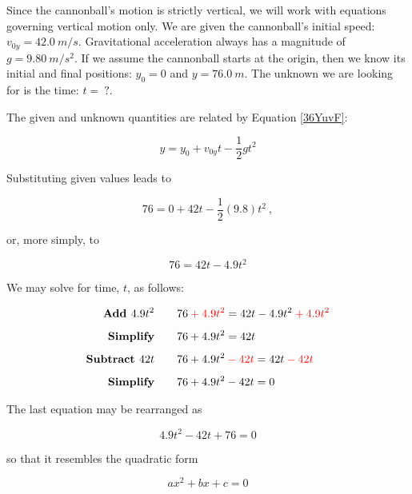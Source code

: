 \documentclass[main.tex]{subfiles}
\begin{document}
\Solution Since the cannonball's motion is strictly vertical, we will work with equations governing vertical motion only. We are given the cannonball's initial speed: $v_{0y} = \SI{42.0}{m/s}$. Gravitational acceleration always has a magnitude of $g = \SI{9.80}{m/s^2}$. If we assume the cannonball starts at the origin, then we know its initial and final positions: $y_0 = 0$ and $y = \SI{76.0}{m}$. The unknown we are looking for is the time: $t =\ ?$.

\vspace{1em}

The given and unknown quantities are related by Equation \eqref{36YuvF}:

\begin{equation*}
    y = y_0 + v_{0y}t - \frac{1}{2}  g t^2
\end{equation*}

Substituting given values leads to 

\begin{equation*}
    76 =  0 + 42 t -\frac{1}{2}(9.8) t^2\ ,
\end{equation*}

or, more simply, to

\begin{equation*}
    76 = 42 t - 4.9 t^2
\end{equation*}

We may solve for time, $t$, as follows:

\begin{align*}
    \textbf{Add $4.9 t^2$} \qquad & 76 \mathbin{\color{red} +} \textcolor{red}{4.9 t^2} = 42 t - 4.9 t^2 \mathbin{\color{red} +} \textcolor{red}{4.9 t^2}\\[1ex]
    \textbf{Simplify} \qquad & 76 + 4.9 t^2 = 42 t\\[1ex]
    \textbf{Subtract $42 t$} \qquad & 76 + 4.9 t^2 \mathbin{\color{red} -} \textcolor{red}{42 t} = 42 t \mathbin{\color{red} -} \textcolor{red}{42 t}\\[1ex]
    \textbf{Simplify} \qquad & 76 + 4.9 t^2 - 42 t = 0
\end{align*}

The last equation may be rearranged as 

\begin{equation} \label{LScbXD}
    4.9 t^2 - 42 t + 76 = 0
\end{equation}

so that it resembles the quadratic form

\begin{equation} \label{WsGUny}
    ax^2 + bx + c = 0
\end{equation}
\end{document}
